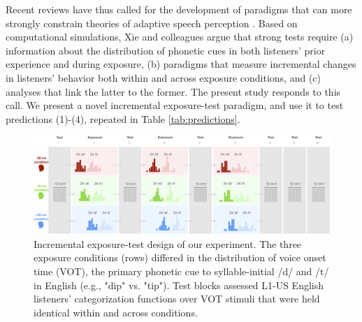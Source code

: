 \documentclass[
  11pt,
  man,mask,floatsintext]{apa6}
\providecommand{\DIFadd}[1]{{\protect\color{blue}\uwave{#1}}} %
\providecommand{\DIFaddFL}[1]{\DIFadd{#1}} %
\providecommand{\DIFaddbeginFL}{} %
\providecommand{\DIFaddendFL}{} %
\newcommand{\DIFaddincludegraphics}[2][]{{\color{blue}\fbox{\DIFOincludegraphics[#1]{#2}}}} %
\DeclareRobustCommand{\DIFaddbeginFL}{\DIFOaddbeginFL \let\includegraphics\DIFaddincludegraphics} %
\DeclareRobustCommand{\DIFaddendFL}{\DIFOaddendFL \let\includegraphics\DIFOincludegraphics} %
\begin{document}
Recent reviews have thus called for the development of paradigms that can more strongly constrain theories of adaptive speech perception \autocite{bent-baeseberk2021,coretta2023,schertz-clare2020,xie2023}. Based on computational simulations, Xie and colleagues argue that strong tests require (a) information about the distribution of phonetic cues in both listeners' prior experience and during exposure, (b) paradigms that measure incremental changes in listeners' behavior both within and across exposure conditions, and (c) analyses that link the latter to the former. The present study responds to this call. We present a novel incremental exposure-test paradigm, and use it to test predictions (1)-(4), repeated in Table \ref{tab:predictions}.

\begin{figure}[H]

{\centering \includegraphics[width=5.8in]{../figures/block_design} 

}

\caption{Incremental exposure-test design of our experiment. The three \DIFaddbeginFL \DIFaddFL{*between-participant* }\DIFaddendFL exposure conditions (rows) differed in the distribution of voice onset time (VOT), the primary phonetic cue to syllable-initial /d/ and /t/ in English (e.g., "dip" vs. "tip"). Test blocks assessed L1-US English listeners' categorization functions over VOT stimuli that were held identical within and across conditions.}\label{fig:block-design-figure}
\end{figure}
\end{document}
